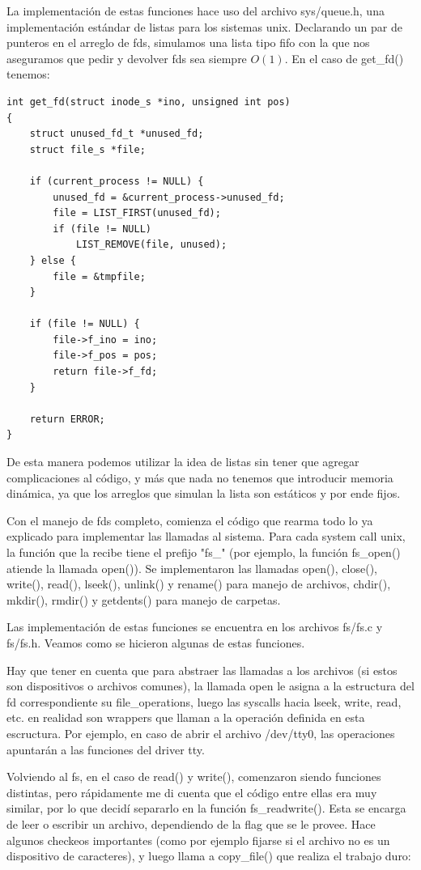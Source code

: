 La implementación de estas funciones hace uso del archivo sys/queue.h, una
implementación estándar de listas para los sistemas unix. Declarando un par de
punteros en el arreglo de fds, simulamos una lista tipo fifo con la que nos
aseguramos que pedir y devolver fds sea siempre $O(1)$. En el caso de get\_fd()
tenemos:

\begin{verbatim}
int get_fd(struct inode_s *ino, unsigned int pos)
{
    struct unused_fd_t *unused_fd;
    struct file_s *file;

    if (current_process != NULL) {
        unused_fd = &current_process->unused_fd;
        file = LIST_FIRST(unused_fd);
        if (file != NULL)
            LIST_REMOVE(file, unused);
    } else {
        file = &tmpfile;
    }

    if (file != NULL) {
        file->f_ino = ino;
        file->f_pos = pos;
        return file->f_fd;
    }

    return ERROR;
}
\end{verbatim}

De esta manera podemos utilizar la idea de listas sin tener que agregar
complicaciones al código, y más que nada no tenemos que introducir memoria
dinámica, ya que los arreglos que simulan la lista son estáticos y por ende
fijos.

Con el manejo de fds completo, comienza el código que rearma todo lo ya
explicado para implementar las llamadas al sistema. Para cada system call unix,
la función que la recibe tiene el prefijo "fs\_" (por ejemplo, la función
fs\_open() atiende la llamada open()). Se implementaron las llamadas open(),
close(), write(), read(), lseek(), unlink() y rename() para manejo de archivos,
chdir(), mkdir(), rmdir() y getdents() para manejo de carpetas.

Las implementación de estas funciones se encuentra en los archivos fs/fs.c y
fs/fs.h. Veamos como se hicieron algunas de estas funciones.

Hay que tener en cuenta que para abstraer las llamadas a los archivos (si estos son dispositivos o
archivos comunes), la llamada open le asigna a la estructura del fd correspondiente su
file\_operations, luego las syscalls hacia lseek, write, read, etc. en realidad son wrappers que
llaman a la operación definida en esta escructura. Por ejemplo, en caso de abrir el archivo
/dev/tty0, las operaciones apuntarán a las funciones del driver tty.

Volviendo al fs, en el caso de read() y write(), comenzaron siendo funciones distintas, pero
rápidamente me di cuenta que el código entre ellas era muy similar, por lo que
decidí separarlo en la función fs\_readwrite(). Esta se encarga de leer o
escribir un archivo, dependiendo de la flag que se le provee. Hace algunos
checkeos importantes (como por ejemplo fijarse si el archivo no es un
dispositivo de caracteres), y luego llama a copy\_file() que realiza el
trabajo duro:

